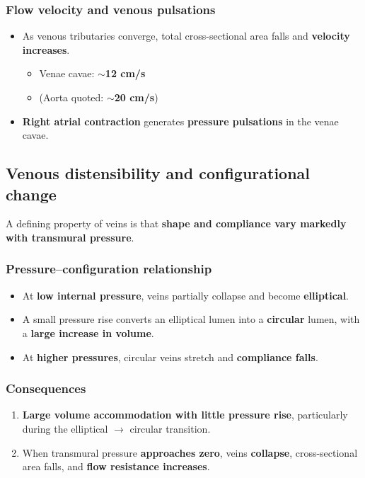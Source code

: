 \documentclass[11pt,a4paper]{article}
\begin{document}
\subsubsection{Flow velocity and venous pulsations}
\begin{itemize}
\item As venous tributaries converge, total cross-sectional area falls and \textbf{velocity increases}.
  \begin{itemize}
  \item Venae cavae: \textbf{$\sim$12 cm/s}
  \item (Aorta quoted: \textbf{$\sim$20 cm/s})
  \end{itemize}
\item \textbf{Right atrial contraction} generates \textbf{pressure pulsations} in the venae cavae.
\end{itemize}

\subsection{Venous distensibility and configurational change}
A defining property of veins is that \textbf{shape and compliance vary markedly with transmural pressure}.

\subsubsection{Pressure--configuration relationship}
\begin{itemize}
\item At \textbf{low internal pressure}, veins partially collapse and become \textbf{elliptical}.
\item A small pressure rise converts an elliptical lumen into a \textbf{circular} lumen, with a \textbf{large increase in volume}.
\item At \textbf{higher pressures}, circular veins stretch and \textbf{compliance falls}.
\end{itemize}

\subsubsection{Consequences}
\begin{enumerate}
\item \textbf{Large volume accommodation with little pressure rise}, particularly during the elliptical $\rightarrow$ circular transition.
\item When transmural pressure \textbf{approaches zero}, veins \textbf{collapse}, cross-sectional area falls, and \textbf{flow resistance increases}.
\end{enumerate}
\end{document}
